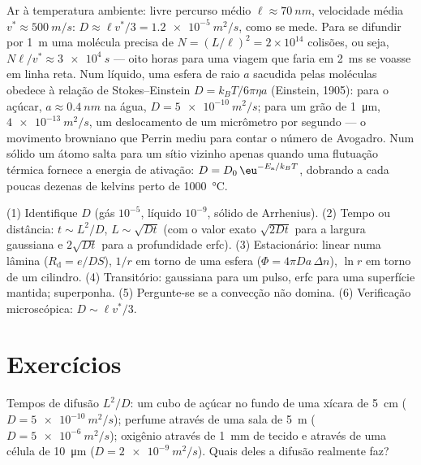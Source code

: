 \begin{example}\label{ex:b2:particle-diffusion:kinetic}
Ar à temperatura ambiente: livre percurso médio $\ell \approx \qty{70}{nm}$,
velocidade média $v^* \approx \qty{500}{m/s}$: $D \approx \ell v^*/3 =
\qty{1.2e-5}{m^2/s}$, como se mede. Para se difundir por \qty{1}{m} uma molécula
precisa de $N = (L/\ell)^2 = 2 \times 10^{14}$ colisões, ou seja, $N\ell/v^*
\approx \qty{3e4}{s}$ --- oito horas para uma viagem que faria em
\qty{2}{ms} se voasse em linha reta. Num líquido, uma esfera de raio $a$
sacudida pelas moléculas obedece à relação de Stokes--Einstein $D =
k_BT/6\pi\eta a$ (Einstein, 1905): para o açúcar, $a \approx \qty{0.4}{nm}$
na água, $D = \qty{5e-10}{m^2/s}$; para um grão de \qty{1}{\micro m},
$\qty{4e-13}{m^2/s}$, um deslocamento de um micrômetro por segundo ---
o movimento browniano que Perrin mediu para contar o número de Avogadro. Num
sólido um átomo salta para um sítio vizinho apenas quando uma flutuação
térmica fornece a energia de ativação: $D = D_0\,\eu^{-E_{\text{a}}/k_BT}$,
dobrando a cada poucas dezenas de kelvins perto de \qty{1000}{\celsius}.
\end{example}

\begin{method}\label{meth:b2:particle-diffusion:method}
(1) Identifique $D$ (gás $10^{-5}$, líquido $10^{-9}$, sólido de Arrhenius).
(2) Tempo ou distância: $t \sim L^2/D$, $L \sim \sqrt{Dt}$ (com o valor exato
$\sqrt{2Dt}$ para a largura gaussiana e $2\sqrt{Dt}$ para a profundidade erfc).
(3) Estacionário: linear numa lâmina ($R_{\text{d}} = e/DS$), $1/r$ em torno de uma
esfera ($\Phi = 4\pi D a\,\Delta n$), $\ln r$ em torno de um cilindro. (4)
Transitório: gaussiana para um pulso, erfc para uma superfície mantida; superponha.
(5) Pergunte-se se a convecção não domina. (6) Verificação microscópica:
$D \sim \ell v^*/3$.
\end{method}

\section{Exercícios}

\begin{exercise}[$\star$]\label{exo:b2:particle-diffusion:1}
Tempos de difusão $L^2/D$: um cubo de açúcar no fundo de uma xícara de \qty{5}{cm}
($D = \qty{5e-10}{m^2/s}$); perfume através de uma sala de \qty{5}{m} ($D =
\qty{5e-6}{m^2/s}$); oxigênio através de \qty{1}{mm} de tecido e através de uma
célula de \qty{10}{\micro m} ($D = \qty{2e-9}{m^2/s}$). Quais deles a
difusão realmente faz?
\end{exercise}

